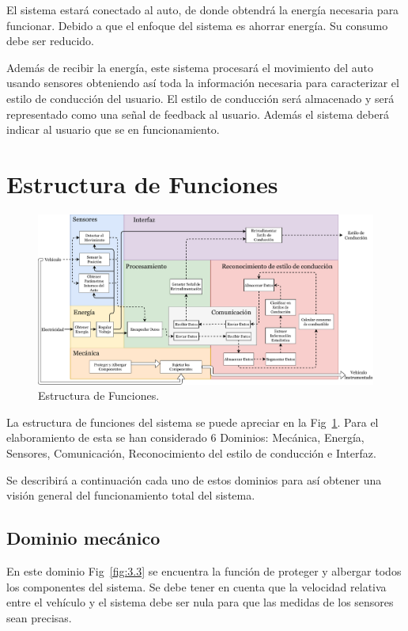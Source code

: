El sistema estará conectado al auto, de donde obtendrá la energía necesaria para funcionar. Debido a que el enfoque del sistema es ahorrar energía. Su consumo debe ser reducido.

Además de recibir la energía, este sistema procesará el movimiento del auto usando sensores obteniendo así toda la información necesaria para caracterizar el estilo de conducción del usuario. El estilo de conducción será almacenado y será representado como una señal de feedback al usuario. Además el sistema deberá indicar al usuario que se en funcionamiento.

\section{Estructura de Funciones}

\begin{figure}
\centering
\includegraphics[width=\textwidth]{Tab3.pdf}
\caption{Estructura de Funciones.}
\label{fig:3.2}
\end{figure}

La estructura de funciones del sistema se puede apreciar en la Fig~\ref{fig:3.2}. Para el elaboramiento de esta se han considerado 6 Dominios: Mecánica, Energía, Sensores, Comunicación, Reconocimiento del estilo de conducción e Interfaz.

Se describirá a continuación cada uno de estos dominios para así obtener una visión general del funcionamiento total del sistema.

\subsection{Dominio mecánico}
En este dominio Fig~\ref{fig:3.3} se encuentra la  función de proteger y albergar todos los componentes del sistema. Se debe tener en cuenta que la velocidad relativa entre el vehículo y el sistema debe ser nula para que las medidas de los sensores sean precisas.

